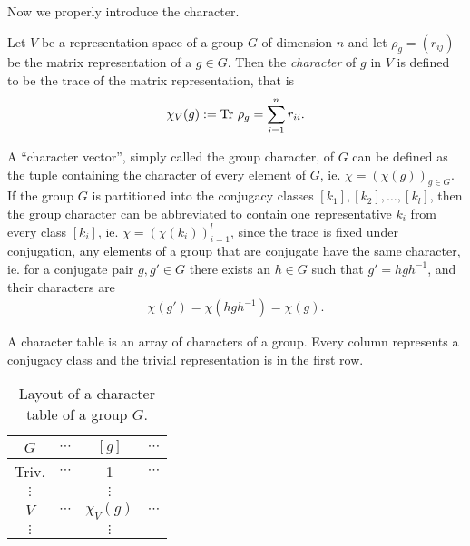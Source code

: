 Now we properly introduce the character.

\begin{definition}\label{def:char}
	Let $V$ be a representation space of a group $G$ of dimension $n$ and let $\rho_g = (r_{ij})$ be the matrix representation of a $g \in G$. Then the \emph{character} of $g$ in $V$ is defined to be the trace of the matrix representation, that is 
	\begin{align*}
		\chi_V(g) := \text{Tr } \rho_g = \sum_{i=1}^{n} r_{ii}.
	\end{align*}
\end{definition}


\begin{notation}
	A ``character vector'', simply called the group character, of $G$ can be defined as the tuple containing the character of every element of $G$, ie. $\chi = (\chi(g))_{g \in G}$. If the group $G$ is partitioned into the conjugacy classes $[k_1], [k_2], \dots, [k_l]$, then the group character can be abbreviated to contain one representative $k_i$ from every class $[k_i]$, ie. $\chi= (\chi(k_i))_{i=1}^l$, since the trace is fixed under conjugation, any elements of a group that are conjugate have the same character, ie. for a conjugate pair $g,g' \in G$ there exists an $h \in G$ such that $g' = hgh^{-1}$, and their characters are
	\begin{align*}
		\chi(g') = \chi(hgh^{-1}) = \chi(g).
	\end{align*}
\end{notation}

\begin{notation}
	A character table is an array of characters of a group.  Every column represents a conjugacy class and the trivial representation is in the first row. 
	\begin{table}[hbt!]
		\centering
		\begin{tabular}{c | c c c }
			  $G$    & $\cdots $ & $[g]$        & $\cdots$ \\ \hline
			 Triv.   & $\cdots$  & 1            & $\cdots$ \\
			$\vdots$ &           & $\vdots$     &          \\
			  $V$    & $\cdots$  & $\chi_V(g) $ & $\cdots$ \\
			$\vdots$ &           & $\vdots$     &
		\end{tabular}
		\caption{Layout of a character table of a group $G$.}
		\label{table:chartableexample}
	\end{table}
\end{notation}

